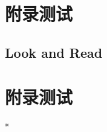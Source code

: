 \section{附录测试}

\subsection{Look and Read}




\section{附录测试}

\zhlipsum
	
\cite{1992mixed}\cite{biot1941general}\cite{branquinho2004infomat}\cite{brassart2012reactive}\cite{rezaeslami2013theory}\cite{wanhassan2023physics}\cite{wanhassan2023temperature}\cite{loken2018thermal}\cite{cheng2022finite}\cite{yang2005interaction}



\begin{Appendix}
	*
\end{Appendix}

















